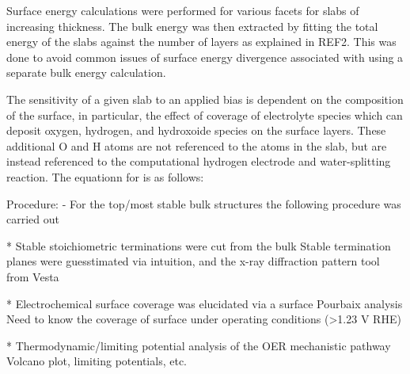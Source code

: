 Surface energy calculations were performed for various facets for slabs of increasing thickness.
The bulk energy was then extracted by fitting the total energy of the slabs against the number of layers as explained in REF2.
This was  done to avoid common issues of surface energy divergence associated with using a separate bulk energy calculation.

The sensitivity of a given slab to an applied bias is dependent on the composition of the surface,
in particular, the effect of coverage of electrolyte species which can deposit oxygen, hydrogen, and hydroxoide species on the surface layers.
These additional O and H atoms are not referenced to the atoms in the slab, but are instead referenced to the computational hydrogen electrode and water-splitting reaction.
The equationn for is as follows:

Procedure:
- For the top/most stable bulk structures the following procedure was carried out

* Stable stoichiometric terminations were cut from the bulk Stable termination planes were guesstimated via intuition, and the x-ray diffraction pattern tool from Vesta

* Electrochemical surface coverage was elucidated via a surface Pourbaix analysis Need to know the coverage of surface under operating conditions (>1.23 V RHE)

* Thermodynamic/limiting potential analysis of the OER mechanistic pathway Volcano plot, limiting potentials, etc.

